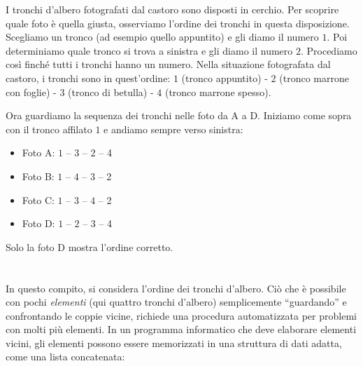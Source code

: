{{I tronchi d’albero fotografati dal castoro sono disposti in cerchio. Per scoprire quale foto è quella giusta, osserviamo l’ordine dei tronchi in questa disposizione. Scegliamo un tronco (ad esempio quello appuntito) e gli diamo il numero $1$. Poi determiniamo quale tronco si trova a sinistra e gli diamo il numero $2$. Procediamo così finché tutti i tronchi hanno un numero. Nella situazione fotografata dal castoro, i tronchi sono in quest’ordine: $1$ (tronco appuntito) - $2$ (tronco marrone con foglie) - $3$ (tronco di betulla) - $4$ (tronco marrone spesso).

{\centering%
\par}

Ora guardiamo la sequenza dei tronchi nelle foto da A a D. Iniziamo come sopra con il tronco affilato $1$ e andiamo sempre verso sinistra:

\begin{itemize}
  \item Foto A: $1$ – $3$ – $2$ – 4
  \item Foto B: $1$ – $4$ – $3$ – 2
  \item Foto C: $1$ – $3$ – $4$ – 2
  \item Foto D: $1$ – $2$ – $3$ – 4
\end{itemize}

Solo la foto D mostra l’ordine corretto.

{\centering%
\par}



\section*{\BrochureItsInformatics}
In questo compito, si considera l’ordine dei tronchi d’albero. Ciò che è possibile con pochi \emph{elementi} (qui quattro tronchi d’albero) semplicemente \enquote{guardando} e confrontando le coppie vicine, richiede una procedura automatizzata per problemi con molti più elementi. In un programma informatico che deve elaborare elementi vicini, gli elementi possono essere memorizzati in una struttura di dati adatta, come una lista concatenata:

{\centering%
\par}

}}
